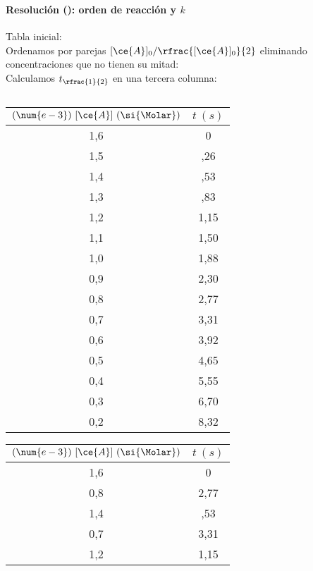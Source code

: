 \begin{frame}
	\frametitle{\ejerciciocmd}
	\framesubtitle{Resolución (): orden de reacción y $k$}
	\begin{overprint}
			Tabla inicial:\\
		\onslide<2>
			Ordenamos por parejas $[\ce{A}]_0/\rfrac{[\ce{A}]_0}{2}$ eliminando concentraciones que no tienen su mitad:\\
		\onslide<3>
			Calculamos $t_{\rfrac{1}{2}}$ en una tercera columna:\\
	\end{overprint}
	\begin{columns}
		\column{.30\textwidth}
			\begin{overprint}
				\onslide<1>
					\begin{tabular}{SS}
						\toprule
							{$(\num{e-3})~[\ce{A}]~(\si{\Molar})$} & {$t~(\si{s})$} \\
						\midrule
							1,6 & 0    \\
							1,5 &  ,26 \\
							1,4 &  ,53 \\
							1,3 &  ,83 \\
							1,2 & 1,15 \\
							1,1 & 1,50 \\
							1,0 & 1,88 \\
							0,9 & 2,30 \\
							0,8 & 2,77 \\
							0,7 & 3,31 \\
							0,6 & 3,92 \\
							0,5 & 4,65 \\
							0,4 & 5,55 \\
							0,3 & 6,70 \\
							0,2 & 8,32 \\
						\bottomrule
					\end{tabular}
				\onslide<2>
					\begin{tabular}{SS}
						\toprule
							{$(\num{e-3})~[\ce{A}]~(\si{\Molar})$} & {$t~(\si{s})$} \\
						\midrule
							1,6 & 0    \\
							0,8 & 2,77 \\[.2cm]
							1,4 &  ,53 \\
							0,7 & 3,31 \\[.2cm]					
							1,2 & 1,15 \\

\end{tabular}
\end{overprint}
\end{columns}
\end{frame}
